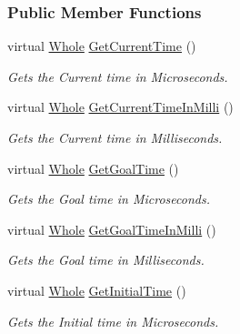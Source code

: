 \subsubsection*{Public Member Functions}
\begin{DoxyCompactItemize}
\item 
virtual \hyperlink{namespaceMezzanine_adcbb6ce6d1eb4379d109e51171e2e493}{Whole} \hyperlink{classMezzanine_1_1SimpleTimer_adfd244c4a9073eb5b0b1f5e2dffec55f}{GetCurrentTime} ()
\begin{DoxyCompactList}\small\item\em Gets the Current time in Microseconds. \item\end{DoxyCompactList}\item 
virtual \hyperlink{namespaceMezzanine_adcbb6ce6d1eb4379d109e51171e2e493}{Whole} \hyperlink{classMezzanine_1_1SimpleTimer_a17038a95d208b1998ea7642a64c7b926}{GetCurrentTimeInMilli} ()
\begin{DoxyCompactList}\small\item\em Gets the Current time in Milliseconds. \item\end{DoxyCompactList}\item 
virtual \hyperlink{namespaceMezzanine_adcbb6ce6d1eb4379d109e51171e2e493}{Whole} \hyperlink{classMezzanine_1_1SimpleTimer_afa2889dc18b435749a64d704e400e382}{GetGoalTime} ()
\begin{DoxyCompactList}\small\item\em Gets the Goal time in Microseconds. \item\end{DoxyCompactList}\item 
virtual \hyperlink{namespaceMezzanine_adcbb6ce6d1eb4379d109e51171e2e493}{Whole} \hyperlink{classMezzanine_1_1SimpleTimer_aa1b5e26e12e6931e8c24e5a9827ad3cd}{GetGoalTimeInMilli} ()
\begin{DoxyCompactList}\small\item\em Gets the Goal time in Milliseconds. \item\end{DoxyCompactList}\item 
virtual \hyperlink{namespaceMezzanine_adcbb6ce6d1eb4379d109e51171e2e493}{Whole} \hyperlink{classMezzanine_1_1SimpleTimer_a526c7d66f76d12de1e604087c146f457}{GetInitialTime} ()
\begin{DoxyCompactList}\small\item\em Gets the Initial time in Microseconds. \item\end{DoxyCompactList}\item 

\end{DoxyCompactItemize}
